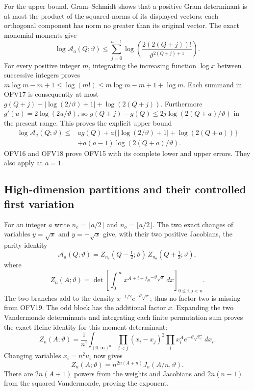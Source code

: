 \documentclass[11pt,a4paper]{article}
\begin{document}
For the upper bound, Gram--Schmidt shows that a positive Gram
determinant is at most the product of the squared norms of its
displayed vectors: each orthogonal component has norm no greater
than its original vector. The exact monomial moments give
\[
\log\mathcal A_a(Q;\vartheta)
\le\sum_{j=0}^{a-1}
\log\left(\frac{2(2(Q+j))!}{\vartheta^{2(Q+j)+1}}\right).
\tag{OFV17}
\]
For every positive integer $m$, integrating the increasing function
$\log x$ between successive integers proves
$m\log m-m+1\le\log(m!)\le m\log m-m+1+\log m$.
Each summand in OFV17 is consequently at most
$g(Q+j)+|\log(2/\vartheta)+1|+\log(2(Q+j))$.
Furthermore $g'(u)=2\log(2u/\vartheta)$, so
$g(Q+j)-g(Q)\le2j\log(2(Q+a)/\vartheta)$ in the present range.
This proves the explicit upper bound
\[
\begin{split}
\log\mathcal A_a(Q;\vartheta)\le{}&
a g(Q)+a\{|\log(2/\vartheta)+1|+\log(2(Q+a))\}\\
&+a(a-1)\log(2(Q+a)/\vartheta).
\end{split}\tag{OFV18}
\]
OFV16 and OFV18 prove OFV15 with its complete lower and upper
errors. They also apply at $a=1$.

\subsection{High-dimension partitions and their controlled first variation}

For an integer $a$ write $n_e=\lceil a/2\rceil$ and
$n_o=\lfloor a/2\rfloor$. The two exact changes of variables
$y=\sqrt{x}$ and $y=-\sqrt{x}$ give, with their two positive
Jacobians, the parity identity
\[
\mathcal A_a(Q;\vartheta)
=Z_{n_e}(Q-\tfrac12;\vartheta)\,
 Z_{n_o}(Q+\tfrac12;\vartheta),
\tag{OFV19}
\]
where
\[
Z_n(A;\vartheta)
=\det\left[\int_0^\infty x^{A+i+j}e^{-\vartheta\sqrt{x}}\,dx
                                      \right]_{0\le i,j<n}.
\]
The two branches add to the density $x^{-1/2}e^{-\vartheta\sqrt{x}}$;
thus no factor two is missing from OFV19. The odd block has the
additional factor $x$. Expanding the two Vandermonde determinants
and integrating each finite permutation sum proves the exact
Heine identity for this moment determinant:
\[
Z_n(A;\vartheta)=\frac1{n!}\int_{(0,\infty)^n}
\prod_{i<j}(x_i-x_j)^2\prod_i x_i^Ae^{-\vartheta\sqrt{x_i}}\,dx_i.
\]
Changing variables $x_i=n^2u_i$ now gives
\[
Z_n(A;\vartheta)=n^{2n(A+n)}J_n(A/n,\vartheta).
\tag{OFV20}
\]
There are $2n(A+1)$ powers from the weights and Jacobians
and $2n(n-1)$ from the squared Vandermonde, proving the exponent.
\end{document}
